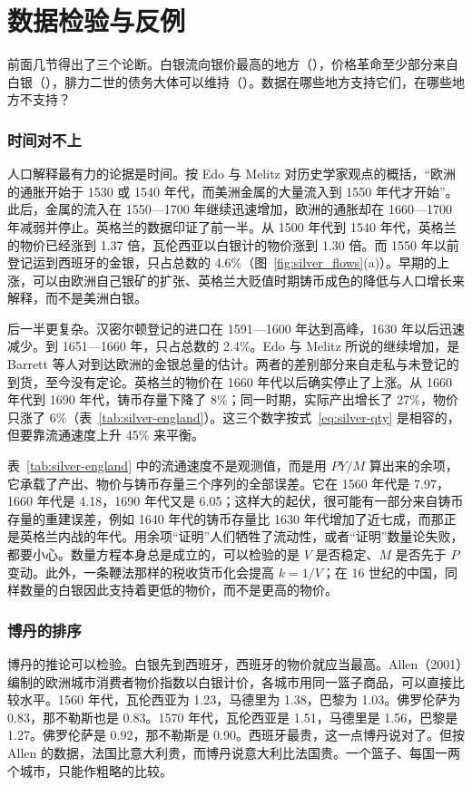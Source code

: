 \section{数据检验与反例}\label{sec:silver-test}

前面几节得出了三个论断。白银流向银价最高的地方（），价格革命至少部分来自白银（），腓力二世的债务大体可以维持（）。数据在哪些地方支持它们，在哪些地方不支持？

\subsubsection{时间对不上}
人口解释最有力的论据是时间。按 Edo 与 Melitz 对历史学家观点的概括，“欧洲的通胀开始于 1530 或 1540 年代，而美洲金属的大量流入到 1550 年代才开始”。此后，金属的流入在 1550—1700 年继续迅速增加，欧洲的通胀却在 1660—1700 年减弱并停止\cite{em2019}。英格兰的数据印证了前一半。从 1500 年代到 1540 年代，英格兰的物价已经涨到 1.37 倍，瓦伦西亚以白银计的物价涨到 1.30 倍。而 1550 年以前登记运到西班牙的金银，只占总数的 4.6\%（图~\ref{fig:silver_flows}(a)）。早期的上涨，可以由欧洲自己银矿的扩张、英格兰大贬值时期铸币成色的降低与人口增长来解释，而不是美洲白银。

后一半更复杂。汉密尔顿登记的进口在 1591—1600 年达到高峰，1630 年以后迅速减少。到 1651—1660 年，只占总数的 2.4\%。Edo 与 Melitz 所说的继续增加，是 Barrett 等人对到达欧洲的金银总量的估计。两者的差别部分来自走私与未登记的到货，至今没有定论。英格兰的物价在 1660 年代以后确实停止了上涨。从 1660 年代到 1690 年代，铸币存量下降了 8\%；同一时期，实际产出增长了 27\%，物价只涨了 6\%（表~\ref{tab:silver-england}）。这三个数字按式~\eqref{eq:silver-qty} 是相容的，但要靠流通速度上升 45\% 来平衡。

\begin{pitfall}
表~\ref{tab:silver-england} 中的流通速度不是观测值，而是用 $PY/M$ 算出来的余项，它承载了产出、物价与铸币存量三个序列的全部误差。它在 1560 年代是 7.97，1660 年代是 4.18，1690 年代又是 6.05；这样大的起伏，很可能有一部分来自铸币存量的重建误差，例如 1640 年代的铸币存量比 1630 年代增加了近七成，而那正是英格兰内战的年代。用余项“证明”人们牺牲了流动性，或者“证明”数量论失败，都要小心。数量方程本身总是成立的，可以检验的是 $V$ 是否稳定、$M$ 是否先于 $P$ 变动。此外，一条鞭法那样的税收货币化会提高 $k=1/V$；在 16 世纪的中国，同样数量的白银因此支持着更低的物价，而不是更高的物价。
\end{pitfall}

\subsubsection{博丹的排序}
博丹的推论可以检验。白银先到西班牙，西班牙的物价就应当最高。Allen（2001）编制的欧洲城市消费者物价指数以白银计价，各城市用同一篮子商品，可以直接比较水平\cite{allen2001}。1560 年代，瓦伦西亚为 1.23，马德里为 1.38，巴黎为 1.03。佛罗伦萨为 0.83，那不勒斯也是 0.83。1570 年代，瓦伦西亚是 1.51，马德里是 1.56，巴黎是 1.27。佛罗伦萨是 0.92，那不勒斯是 0.90。西班牙最贵，这一点博丹说对了。但按 Allen 的数据，法国比意大利贵，而博丹说意大利比法国贵。一个篮子、每国一两个城市，只能作粗略的比较。

